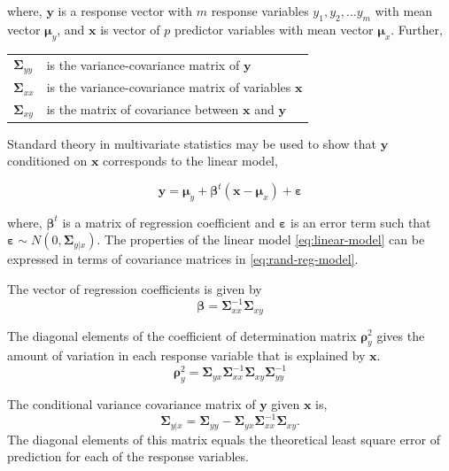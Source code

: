 \documentclass[num-refs]{wiley-article}
\providecommand{\tightlist}{%
  \setlength{\itemsep}{0pt}\setlength{\parskip}{0pt}}
\begin{document}
where, \(\mathbf{y}\) is a response vector with \(m\) response variables
\(y_1, y_2, \ldots y_m\) with mean vector \(\boldsymbol{\mu}_y\), and
\(\mathbf{x}\) is vector of \(p\) predictor variables with mean vector
\(\boldsymbol{\mu}_x\). Further,

\begin{longtable}[]{@{}ll@{}}
\toprule
\(\boldsymbol{\Sigma}_{yy}\) & is the variance-covariance matrix of
\(\mathbf{y}\)\tabularnewline
\(\boldsymbol{\Sigma}_{xx}\) & is the variance-covariance matrix of
variables \(\mathbf{x}\)\tabularnewline
\(\boldsymbol{\Sigma}_{xy}\) & is the matrix of covariance between
\(\mathbf{x}\) and \(\mathbf{y}\)\tabularnewline
\bottomrule
\end{longtable}

\addtocounter{table}{-1}

Standard theory in multivariate statistics may be used to show that
\(\mathbf{y}\) conditioned on \(\mathbf{x}\) corresponds to the linear
model,

\begin{equation}
\mathbf{y} = \boldsymbol{\mu}_y + \boldsymbol{\beta}^t (\mathbf{x} - \boldsymbol{\mu}_x) + \boldsymbol{\varepsilon}
  \label{eq:linear-model}
\end{equation}

where, \(\boldsymbol{\beta}^t\) is a matrix of regression coefficient
and \(\boldsymbol{\varepsilon}\) is an error term such that
\(\boldsymbol{\varepsilon} \sim N\left(0, \boldsymbol{\Sigma}_{y|x}\right)\).
The properties of the linear model \eqref{eq:linear-model} can be
expressed in terms of covariance matrices in \eqref{eq:rand-reg-model}.

\begin{description}
\tightlist
\item[Regression Coefficients]
The vector of regression coefficients is given by
\[ \boldsymbol{\beta} = \boldsymbol{\Sigma}_{xx}^{-1}\boldsymbol{\Sigma}_{xy}\]
\item[Coefficient of Determination]
The diagonal elements of the coefficient of determination matrix
\(\boldsymbol{\rho}_y^2\) gives the amount of variation in each response
variable that is explained by \(\mathbf{x}\).
\[\boldsymbol{\rho}_y^2 = \boldsymbol{\Sigma}_{yx}\boldsymbol{\Sigma}_{xx}^{-1}\boldsymbol{\Sigma}_{xy}\boldsymbol{\Sigma}_{yy}^{-1}\]
\item[Conditional variance]
The conditional variance covariance matrix of \(\mathbf{y}\) given
\(\mathbf{x}\) is,
\[\boldsymbol{\Sigma}_{y|x} = \boldsymbol{\Sigma}_{yy} - \boldsymbol{\Sigma}_{yx}\boldsymbol{\Sigma}_{xx}^{-1}\boldsymbol{\Sigma}_{xy}.\]
The diagonal elements of this matrix equals the theoretical least square
error of prediction for each of the response variables.
\end{description}
\end{document}
